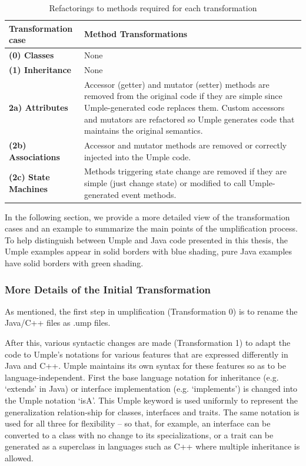 \begin{table}[htbp]
	\caption{Refactorings to methods required for each transformation}
	\label{table:transformations}
    \centering
    \begin{tabularx}{\textwidth}{| X | X |}
        \toprule
        \rowcolor[HTML]{BBDAFF}
       \textbf{ Transformation case  }   & \textbf{Method Transformations}
        \\ \hline
        \textbf{(0)  Classes }        & None      \\ \hline
        \textbf{(1)  Inheritance}     & None       \\ \hline
        \textbf{2a)  Attributes}      & 
        Accessor (getter) and mutator (setter) methods are removed from the original code if they are simple since 		Umple-generated code replaces them. Custom accessors and mutators are refactored so Umple generates code 			that maintains the original
        semantics.         		\\ \hline
        \textbf{(2b) Associations }   & 
 		Accessor and mutator methods are removed or correctly injected into the Umple code.        
		\\ \hline
        \textbf{(2c) State Machines  }  & 
		Methods triggering state change are removed if they are simple (just change state) or modified to call 				Umple-generated event methods.  	
		\\ \hline
    \end{tabularx}
\end{table}

In the following section, we provide a more detailed view of the transformation cases and an example to summarize the main points of the umplification process. To help distinguish between Umple and Java code presented in this thesis, the Umple examples appear in solid borders with blue shading, pure Java examples have solid borders with green shading. 

\subsubsection{More Details of the Initial Transformation}

As mentioned, the first step in umplification (Transformation 0) is to rename the Java/C++ files as .ump files.

After this, various syntactic changes are made (Transformation 1) to adapt the code to Umple's notations for various features that are expressed differently in Java and C++. Umple maintains its own syntax for these features so as to be language-independent.
First the base language notation for inheritance (e.g. `extends' in Java) or interface implementation (e.g. `implements') is changed into the Umple notation `isA'. This Umple keyword is used uniformly to represent the generalization relation-ship for classes, interfaces and traits. The same notation is used for all three for flexibility – so that, for example, an interface can be converted to a class with no change to its specializations, or a trait can be generated as a superclass in languages such as C++ where multiple inheritance is allowed.

